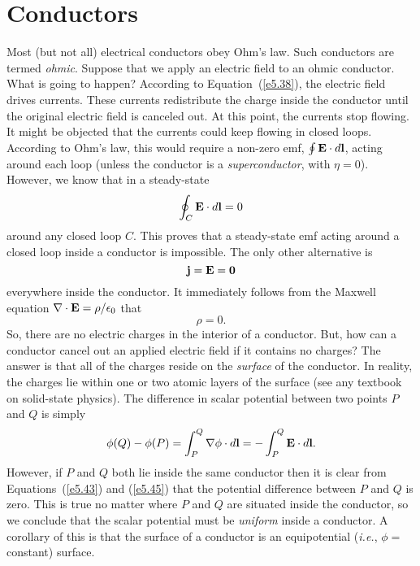 \section{Conductors}\label{s5.3}
Most (but not all) electrical conductors obey Ohm's law. Such conductors are
termed  {\em ohmic}.
Suppose that we apply an electric field to an ohmic  conductor. What is going to
happen? According to Equation~(\ref{e5.38}), the electric field drives
currents. These currents redistribute the charge inside the conductor until the
original electric field is canceled out. At this point, the currents stop
flowing. It might be objected that the currents
could keep flowing in closed loops. According to Ohm's law, this would
require a non-zero  emf, $\oint {\bf E} \cdot d{\bf l}$, 
 acting around each loop (unless the conductor is a
{\em superconductor}, with $\eta = 0$). However, we know that in a steady-state
\begin{equation}
\oint_C {\bf E} \cdot d {\bf l } = 0
\end{equation}
around any closed loop $C$. This proves that a steady-state emf acting around
a closed loop inside a conductor is impossible. The only other alternative is 
\begin{equation}\label{e5.43}
{\bf j} = {\bf E} = {\bf 0}
\end{equation}
everywhere inside  the conductor. It immediately follows from the Maxwell equation
$\nabla\cdot {\bf E} = \rho/\epsilon_0$
that
\begin{equation}
\rho = 0.
\end{equation}
So, there are no electric charges in the interior of a 
conductor. But, how can a conductor cancel out an applied electric field
if it contains no charges? The answer is that all of the charges reside on the
{\em surface}\/ of the conductor. 
In reality, the charges  lie
within one or two atomic layers of the surface (see any textbook on solid-state
physics). 
The difference in scalar potential between
two points $P$ and $Q$ is simply
\begin{equation}\label{e5.45}
\phi(Q) - \phi(P) = \int_P^Q \nabla\phi \cdot d{\bf l} = -
\int_P^Q {\bf E} \cdot d{\bf l}.
\end{equation}
However, if $P$ and $Q$ both lie inside the same conductor 
then it is clear from Equations~(\ref{e5.43}) and (\ref{e5.45}) that the potential difference between $P$ and
$Q$ is zero. This is true no matter where $P$ and $Q$ are situated inside the
conductor, so we conclude that the scalar potential must be
 {\em uniform}\/ inside a conductor.
A corollary of this is that the surface of a conductor is
 an equipotential  ({\em i.e.}, $\phi = $ constant) surface.

